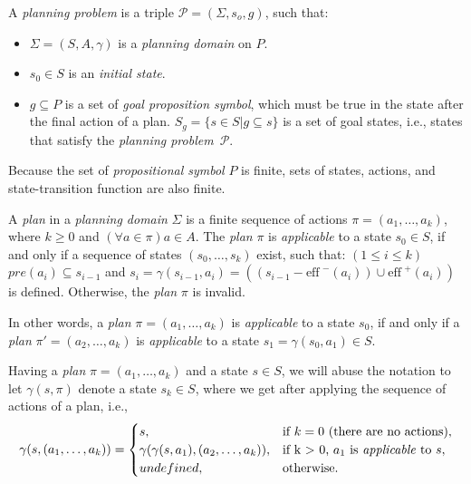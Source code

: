 \begin{defn}\label{def01:2}
  A \emph{planning problem} is a triple $\mathcal{P}=(\Sigma,s_o,g)$, such that:

  \begin{itemize}
    \item $\Sigma = (S, A, \gamma)$ is a \emph{planning domain} on $P$.
    
    \item $s_0 \in S$ is an \emph{initial state}.
    
    \item $g \subseteq P$ is a set of \emph{goal proposition symbol}, which must be true in the state after the final action of a plan. $S_g=\{s \in S | g \subseteq s\}$ is a set of goal states, i.e., states that satisfy the \emph{planning problem}~$\mathcal{P}.$
  \end{itemize}
\end{defn}

\noindent
Because the set of \emph{propositional symbol} $P$ is finite, sets of states, actions, and state-transition function are also finite.

\begin{defn}\label{def01:3}
  A \emph{plan} in a \emph{planning domain} $\Sigma$ is a finite sequence of actions $\pi=(a_1,\dots,a_k)$, where $k \geq 0$ and $(\forall a \in \pi) a \in A$. The \emph{plan} $\pi$ is \emph{applicable} to a state $s_0 \in S$, if and only if a sequence of states $(s_0,\dots,s_k)$ exist, such that: \mbox{$(1 \leq i \leq k)$} $pre(a_i) \subseteq s_{i-1}$ and $s_i = \gamma(s_{i-1},a_i) = ((s_{i-1}-\text{eff}^{\,\,-}(a_i)) \cup \text{eff}^{\,\,+}(a_i))$ is defined. Otherwise, the \emph{plan} $\pi$ is invalid. 

  \medskip\noindent
  In other words, a \emph{plan} $\pi=(a_1,\dots,a_k)$ is \emph{applicable} to a state $s_0$, if and only if a \emph{plan} $\pi'=(a_2,\dots,a_k)$ is \emph{applicable} to a state $s_1=\gamma(s_0,a_1) \in S$.

  \medskip\noindent
  Having a \emph{plan} $\pi=(a_1,\dots,a_k)$ and a state $s \in S$, we will abuse the notation to let $\gamma(s,\pi)$ denote a state $s_k \in S$, where we get after applying the sequence of actions of a plan, i.e.,
    \[
    \gamma(s,(a_1,\dots,a_k))=
    \begin{cases}
    s, & \text{if $k=0$ (there are no actions)},\\
    \gamma(\gamma(s,a_1),(a_2,\dots,a_k)), & \text{if k $>$ 0, $a_1$ is \emph{applicable} to $s$}, \\
    undefined, & \text{otherwise}.
    \end{cases}
    \]
\end{defn}



